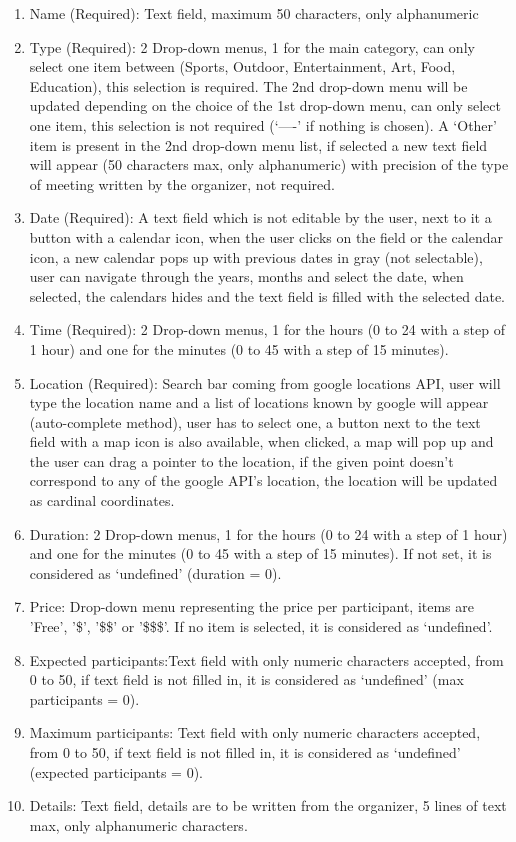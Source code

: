 \documentclass[conference]{IEEEtran}
\begin{document}
\begin{enumerate}
    \item Name (Required): Text field, maximum 50 characters, only alphanumeric
    \item Type (Required): 2 Drop-down menus, 1 for the main category, can only select one item between (Sports, Outdoor, Entertainment, Art, Food, Education), this selection is required. The 2nd drop-down menu will be updated depending on the choice of the 1st drop-down menu, can only select one item, this selection is not required (‘----’ if nothing is chosen). A ‘Other’ item is present in the 2nd drop-down menu list, if selected a new text field will appear (50 characters max, only alphanumeric) with precision of the type of meeting written by the organizer, not required.
    \item Date (Required): A text field which is not editable by the user, next to it a button with a calendar icon, when the user clicks on the field or the calendar icon, a new calendar pops up with previous dates in gray (not selectable), user can navigate through the years, months and select the date, when selected, the calendars hides and the text field is filled with the selected date.
    \item Time (Required): 2 Drop-down menus, 1 for the hours (0 to 24 with a step of 1 hour) and one for the minutes (0 to 45 with a step of 15 minutes).
    \item Location (Required): Search bar coming from google locations API, user will type the location name and a list of locations known by google will appear (auto-complete method), user has to select one, a button next to the text field with a map icon is also available, when clicked, a map will pop up and the user can drag a pointer to the location, if the given point doesn’t correspond to any of the google API’s location, the location will be updated as cardinal coordinates.
    \item Duration: 2 Drop-down menus, 1 for the hours (0 to 24 with a step of 1 hour) and one for the minutes (0 to 45 with a step of 15 minutes). If not set, it is considered as ‘undefined’ (duration = 0).
    \item Price: Drop-down menu representing the price per participant, items are 'Free', '\$', '\$\$' or '\$\$\$'. If no item is selected, it is considered as ‘undefined’.
    \item Expected participants:Text field with only numeric characters accepted, from 0 to 50, if text field is not filled in, it is considered as ‘undefined’ (max participants = 0).
    \item Maximum participants: Text field with only numeric characters accepted, from 0 to 50, if text field is not filled in, it is considered as ‘undefined’ (expected participants = 0).
    \item Details: Text field, details are to be written from the organizer, 5 lines of text max, only alphanumeric characters.
\end{enumerate}
\end{document}
